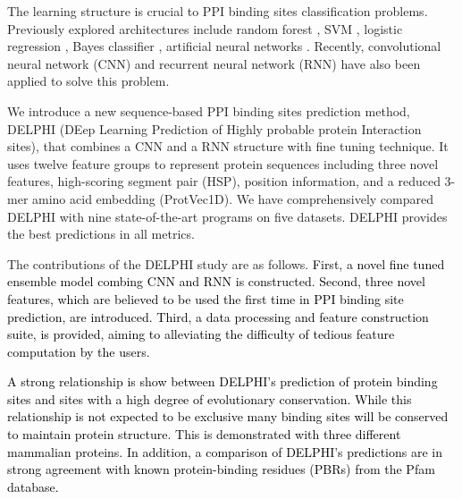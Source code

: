 \documentclass{bioinfo}
\newcommand{\myColor}{black}
\newcommand{\mySecondColor}{black}
\begin{document}
The learning structure is crucial to PPI binding sites classification problems. Previously explored architectures include random forest \citep{wei2016protein, wang2019protein}, SVM \citep{wei2016protein}, logistic regression \citep{zhang2019scriber}, Bayes classifier \citep{murakami2010applying}, artificial neural networks \citep{singh2014springs}. Recently, convolutional neural network (CNN) \citep{zeng2019protein} and recurrent neural network (RNN) \citep{zhang2019sequence} have also been applied to solve this problem. 

We introduce a new sequence-based PPI binding sites prediction method, DELPHI (DEep Learning Prediction of Highly probable protein Interaction sites), that combines a CNN and a RNN structure with fine tuning technique. It uses twelve feature groups to represent protein sequences including three novel features, high-scoring segment pair (HSP), position information, and a reduced 3-mer amino acid embedding (ProtVec1D). We have comprehensively compared DELPHI with nine state-of-the-art programs on five datasets. DELPHI provides the best predictions in all metrics. 

The contributions of the DELPHI study are as follows. \textcolor{\myColor}{
First, a novel fine tuned ensemble model combing CNN and RNN is constructed. Second, three novel features, which are believed to be used the first time in PPI binding site prediction, are introduced. Third, a data processing and feature construction suite, is provided, aiming to alleviating the difficulty of tedious feature computation by the users.}

\textcolor{\mySecondColor}{A strong relationship is show between DELPHI's prediction of protein binding sites and sites with a high degree of evolutionary conservation. While this relationship is not expected to be exclusive many binding sites will be conserved to maintain protein structure. This is demonstrated with three different mammalian proteins.  In addition, a comparison of DELPHI's predictions are in strong agreement with known protein-binding residues (PBRs) from the Pfam database.}
\end{document}
